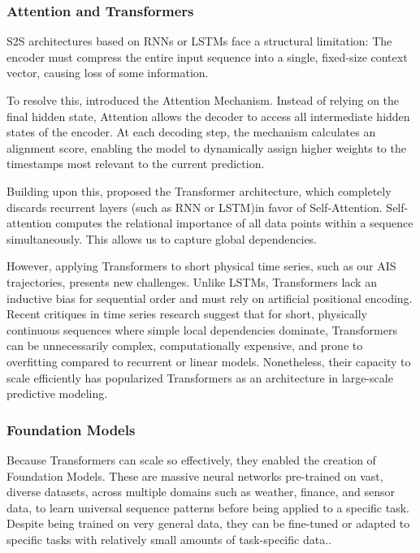 \subsubsection{Attention and Transformers}
   \ac{S2S} architectures based on \acp{RNN} or \acp{LSTM} face a structural limitation: The encoder must compress the entire input sequence into a single, fixed-size context vector, causing loss of some information.

    To resolve this, \cite{bahdanau2016neuralmachinetranslationjointly} introduced the Attention Mechanism. Instead of relying on the final hidden state, Attention allows the decoder to access all intermediate hidden states of the encoder. At each decoding step, the mechanism calculates an alignment score, enabling the model to dynamically assign higher weights to the timestamps most relevant to the current prediction.

    Building upon this, \cite{attentioniayn} proposed the Transformer architecture, which completely discards recurrent layers (such as \ac{RNN} or \ac{LSTM})in favor of Self-Attention. Self-attention computes the relational importance of all data points within a sequence simultaneously. This allows us to capture global dependencies.

    However, applying Transformers to short physical time series, such as our \ac{AIS} trajectories, presents new challenges. Unlike \acp{LSTM}, Transformers lack an inductive bias for sequential order and must rely on artificial positional encoding. Recent critiques in time series research \cite{zeng2022transformerseffectivetimeseries}  suggest that for short, physically continuous sequences where simple local dependencies dominate, Transformers can be unnecessarily complex, computationally expensive, and prone to overfitting compared to recurrent or linear models. 
    Nonetheless, their capacity to scale efficiently has popularized  Transformers as an architecture in large-scale predictive modeling. %
    
\subsubsection{Foundation Models}
    Because Transformers can scale so effectively, they enabled the creation of Foundation Models. These are massive neural networks pre-trained on vast, diverse datasets, across multiple domains such as weather, finance, and sensor data, to learn universal sequence patterns before being applied to a specific task. Despite being trained on very general data, they can be fine-tuned or adapted to specific tasks with relatively small amounts of task-specific data.\cite{Liang_2024foundation}.

